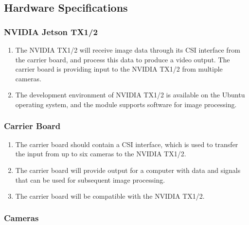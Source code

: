 \documentclass[letterpaper,10pt,serif,draftclsnofoot,onecolumn,compsoc,titlepage]{IEEEtran}
\begin{document}
\subsection{Hardware Specifications}

\subsubsection{NVIDIA Jetson TX1/2}

\begin{enumerate}[label=\alph*]
	\item The NVIDIA TX1/2 will receive image data through its CSI interface from
	the carrier board, and process this data to produce a video output. The carrier
	board is providing input to the NVIDIA TX1/2 from multiple cameras. \\
	\item The development environment of NVIDIA TX1/2 is available on the Ubuntu 
	operating system, and the module supports software for image processing.\\ 
	\end{enumerate}

\subsubsection{Carrier Board}

\begin{enumerate}[label=\alph*]
	\item The carrier board should contain a CSI interface, which is used to transfer the
	input from up to six cameras to the NVIDIA TX1/2. \\
	\item The carrier board will provide output for a computer with data and signals that 
	can be used for subsequent image processing.\\
	\item The carrier board will be compatible with the NVIDIA TX1/2.\\
\end{enumerate}

\subsubsection{Cameras}
\end{document}
